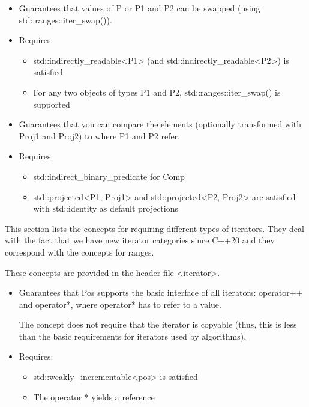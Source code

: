 
\begin{itemize}
\item
Guarantees that values of P or P1 and P2 can be swapped (using std::ranges::iter\_swap()).

\item
Requires:
\begin{itemize}
\item
std::indirectly\_readable<P1> (and std::indirectly\_readable<P2>) is satisfied

\item
For any two objects of types P1 and P2, std::ranges::iter\_swap() is supported
\end{itemize}
\end{itemize}


\begin{itemize}
\item
Guarantees that you can compare the elements (optionally transformed with Proj1 and Proj2) to where P1 and P2 refer.

\item
Requires:
\begin{itemize}
\item
std::indirect\_binary\_predicate for Comp

\item
std::projected<P1, Proj1> and std::projected<P2, Proj2> are satisfied with std::identity as default projections
\end{itemize}
\end{itemize}


This section lists the concepts for requiring different types of iterators. They deal with the fact that we have new iterator categories since C++20 and they correspond with the concepts for ranges.

These concepts are provided in the header file <iterator>.


\begin{itemize}
\item
Guarantees that Pos supports the basic interface of all iterators: operator++ and operator*, where operator* has to refer to a value.

The concept does not require that the iterator is copyable (thus, this is less than the basic requirements for iterators used by algorithms).

\item
Requires:
\begin{itemize}
\item
std::weakly\_incrementable<pos> is satisfied

\item
The operator * yields a reference
\end{itemize}
\end{itemize}

